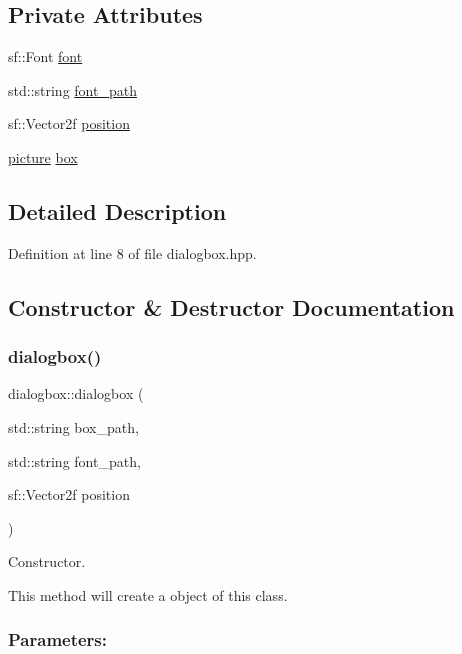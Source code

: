 \subsection*{Private Attributes}
\begin{DoxyCompactItemize}
\item 
sf\+::\+Font \hyperlink{classdialogbox_a37ebf2968cfa80f0cdde35d2722f40ad}{font}
\item 
std\+::string \hyperlink{classdialogbox_a11fd386b5bb381072262a574ea25c8c3}{font\+\_\+path}
\item 
sf\+::\+Vector2f \hyperlink{classdialogbox_a05031b5d9149389d301638da9005e744}{position}
\item 
\hyperlink{classpicture}{picture} \hyperlink{classdialogbox_aa0686bdcc541c36e19ba3122befe1978}{box}
\end{DoxyCompactItemize}


\subsection{Detailed Description}


Definition at line 8 of file dialogbox.\+hpp.



\subsection{Constructor \& Destructor Documentation}
\mbox{\label{classdialogbox_a44b14d7932ab0866ba2d3708d406bfb7}} 
\subsubsection{\texorpdfstring{dialogbox()}{dialogbox()}}
{\footnotesize\ttfamily dialogbox\+::dialogbox (\begin{DoxyParamCaption}\item[{std\+::string}]{box\+\_\+path,  }\item[{std\+::string}]{font\+\_\+path,  }\item[{sf\+::\+Vector2f}]{position }\end{DoxyParamCaption})}



Constructor. 

This method will create a object of this class.

\subsubsection*{Parameters\+: }

